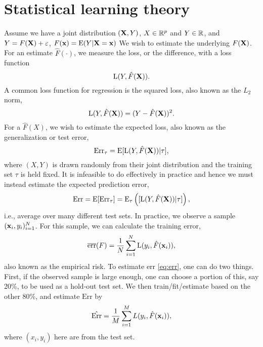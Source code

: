 \chapter{Statistical learning theory}\label{ch:learning-theory}
Assume we have a joint distribution $(\mathbf{X}, Y)$, $X\in\mathbb{R}^p$ and $Y\in\mathbb{R}$, and $Y=F(\mathbf{X})+\varepsilon$, $F(\mathbf{x})=\operatorname{E}(Y|\mathbf{X}=\mathbf{x})$ We wish to estimate the underlying $F(\mathbf{X})$. For an estimate $\hat{F}(\cdot)$, we measure the loss, or the difference, with a loss function
\begin{equation}
    \operatorname{L}(Y, \hat{F}(\mathbf{X})).
\end{equation}
A common loss function for regression is the squared loss, also known as the $L_2$ norm,
\begin{equation}
    \operatorname{L}(Y, \hat{F}(\mathbf{X}))=(Y-\hat{F}(\mathbf{X}))^2.
\end{equation}
For a $\hat{F}(X)$, we wish to estimate the expected loss, also known as the generalization or test error,
\begin{equation}
    \text{Err}_{\tau}=\operatorname{E}[\operatorname{L}(Y,\hat{F}(\mathbf{X}))|\tau],
\end{equation}
where $(X,Y)$ is drawn randomly from their joint distribution and the training set $\tau$ is held fixed. It is infeasible to do effectively in practice  and hence we must instead estimate the expected prediction error,
\begin{equation}\label{eq:err}
    \text{Err}=\operatorname{E}[\text{Err}_\tau]=\operatorname{E}_\tau\left([\operatorname{L}(Y,\hat{F}(\mathbf{X}))|\tau]\right),
\end{equation}
i.e., average over many different test sets.
In practice, we observe a sample $(\mathbf{x}_i,y_i)_{i=1}^N$. For this sample, we can calculate the training error,
\begin{equation}\label{eq:empirical-risk}
    \overline{\text{err}}(F)=\frac{1}{N}\sum_{i=1}^N\operatorname{L}(y_i, \hat{F}(\mathbf{x}_i)),
\end{equation}
also known as the empirical risk. To estimate $\text{err}$ \eqref{eq:err}, one can do two things. First, if the observed sample is large enough, one can choose a portion of this, say 20\%, to be used as a hold-out test set. We then train/fit/estimate based on the other 80\%, and estimate $\text{Err}$ by
\begin{equation}
    \hat{\text{Err}}=\frac{1}{M}\sum_{i=1}^ML(y_i,\hat{F}(\mathbf{x}_i)),
\end{equation}
where $(x_i,y_i)$ here are from the test set.